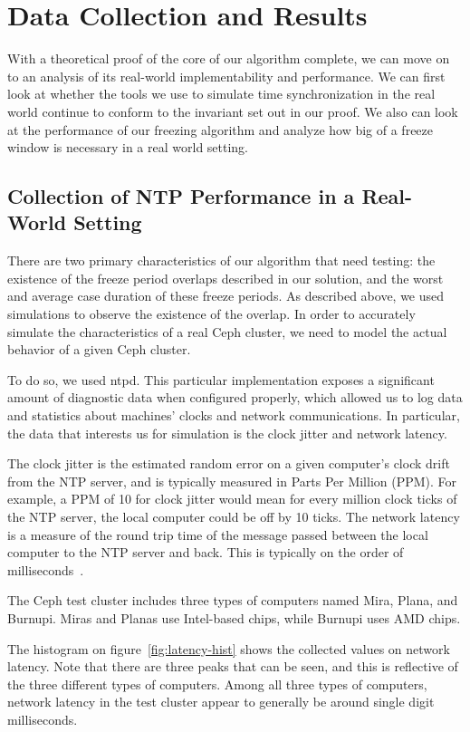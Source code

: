 \chapter{Data Collection and Results}
\label{sec:results}


With a theoretical proof of the core of our algorithm complete, we can
move on to an analysis of its real-world implementability and
performance. We can first look at whether the tools we use to simulate
time synchronization in the real world continue to conform to the
invariant set out in our proof. We also can look at the performance of
our freezing algorithm and analyze how big of a freeze window is
necessary in a real world setting.

\section{Collection of NTP Performance in a Real-World Setting}

There are two primary characteristics of our algorithm that need
testing: the existence of the freeze period overlaps described in our
solution, and the worst and average case duration of these freeze
periods. As described above, we used simulations to observe the
existence of the overlap. In order to accurately simulate the
characteristics of a real Ceph cluster, we need to model the actual
behavior of a given Ceph cluster.

To do so, we used ntpd. This particular implementation exposes a
significant amount of diagnostic data when configured properly, which
allowed us to log data and statistics about machines' clocks and
network communications. In particular, the data that interests us for
simulation is the clock jitter and network latency.

The clock jitter is the estimated random error on a given computer's
clock drift from the NTP server, and is typically measured in Parts
Per Million (PPM). For example, a PPM of 10 for clock jitter would
mean for every million clock ticks of the NTP server, the local
computer could be off by 10 ticks. The network latency is a measure of
the round trip time of the message passed between the local computer
to the NTP server and back. This is typically on the order of
milliseconds~\cite{Sage}.

The Ceph test cluster includes three types of computers named Mira,
Plana, and Burnupi. Miras and Planas use Intel-based chips, while
Burnupi uses AMD chips.

The histogram on figure~\ref{fig:latency-hist} shows the collected
values on network latency. Note that there are three peaks that can be
seen, and this is reflective of the three different types of
computers. Among all three types of computers, network latency in the
test cluster appear to generally be around single digit milliseconds.

